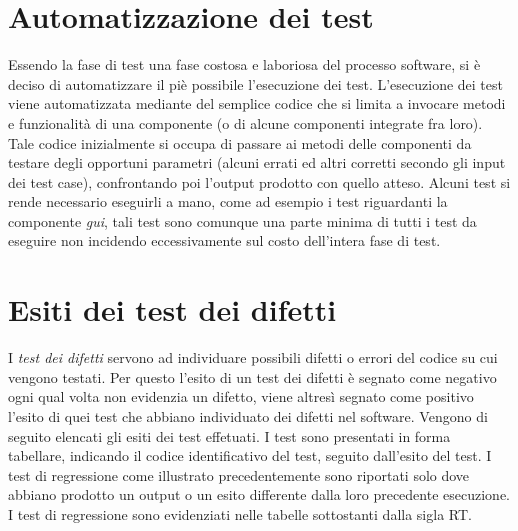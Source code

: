 \section{Automatizzazione dei test}
Essendo la fase di test una fase costosa e laboriosa del processo software, si \`e deciso di automatizzare il pi\`e possibile l'esecuzione dei test. L'esecuzione dei test viene automatizzata mediante del semplice codice che si limita a invocare metodi e funzionalit\`a di una componente (o di alcune componenti integrate fra loro). Tale codice inizialmente si occupa di passare ai metodi delle componenti da testare degli opportuni parametri (alcuni errati ed altri corretti secondo gli input dei test case), confrontando poi l'output prodotto con quello atteso.
Alcuni test si rende necessario eseguirli a mano, come ad esempio i test riguardanti la componente \textit{gui}, tali test sono comunque una parte minima di tutti i test da eseguire non incidendo eccessivamente sul costo dell'intera fase di test.
\section{Esiti dei test dei difetti}
I \textit{test dei difetti} servono ad individuare possibili difetti o errori del codice su cui vengono testati. Per questo l'esito di un test dei difetti \`e segnato come negativo ogni qual volta non evidenzia un difetto, viene altres\`i segnato come positivo l'esito di quei test che abbiano individuato dei difetti nel software.
Vengono di seguito elencati gli esiti dei test effetuati. I test  sono presentati in forma tabellare, indicando il codice identificativo del test, seguito dall'esito del test. I test di regressione come illustrato precedentemente sono riportati solo dove abbiano prodotto un output o un esito differente dalla loro precedente esecuzione. I test di regressione sono evidenziati nelle tabelle sottostanti dalla sigla RT.


